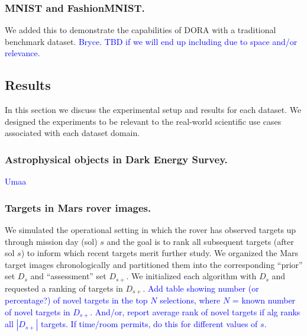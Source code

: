 \documentclass[letterpaper]{article} %
\newcommand{\todo}[1]{\textcolor{blue}{#1}}
\begin{document}

\subsubsection{MNIST and FashionMNIST.}
We added this to demonstrate the capabilities of DORA with a traditional
benchmark dataset. \todo{Bryce. TBD if we will end up including due to
space and/or relevance.}

\subsection{Results}
In this section we discuss the experimental setup and results for each dataset.
We designed the experiments to be relevant to the real-world scientific use 
cases associated with each dataset domain. 

\subsubsection{Astrophysical objects in Dark Energy Survey.}
\todo{Umaa}

\subsubsection{Targets in Mars rover images.}
We simulated the operational setting in which the rover has observed
targets up through mission day (sol) $s$ and the goal is to rank all
subsequent targets (after sol $s$) to inform which recent targets
merit further study.  We organized the Mars target images
chronologically and partitioned them into the corresponding ``prior''
set $D_s$ and ``assessment'' set $D_{s+}$. We initialized each
algorithm with $D_s$ and requested a ranking of targets in $D_{s+}$.
\todo{Add table showing number (or percentage?) of novel targets in
the top $N$ selections, where $N$ = known number of novel targets in
$D_{s+}$.  And/or, report average rank of novel targets if alg ranks all
$|D_{s+}|$ targets. If time/room permits, do this for different values
of $s$.} 
\end{document}

